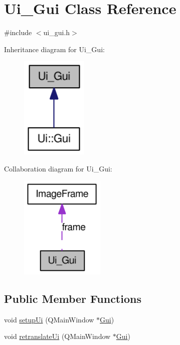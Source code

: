 \hypertarget{classUi__Gui}{
\section{Ui\_\-Gui Class Reference}
\label{classUi__Gui}
}


{\ttfamily \#include $<$ui\_\-gui.h$>$}



Inheritance diagram for Ui\_\-Gui:\nopagebreak
\begin{figure}[H]
\begin{center}
\leavevmode
\includegraphics[width=90pt]{classUi__Gui__inherit__graph}
\end{center}
\end{figure}


Collaboration diagram for Ui\_\-Gui:\nopagebreak
\begin{figure}[H]
\begin{center}
\leavevmode
\includegraphics[width=114pt]{classUi__Gui__coll__graph}
\end{center}
\end{figure}
\subsection*{Public Member Functions}
\begin{DoxyCompactItemize}
\item 
void \hyperlink{classUi__Gui_ac7b48f664dfaf8cec328b4234401e522}{setupUi} (QMainWindow $\ast$\hyperlink{classGui}{Gui})
\item 
void \hyperlink{classUi__Gui_a19b2bac2de017782b9a5cae039980387}{retranslateUi} (QMainWindow $\ast$\hyperlink{classGui}{Gui})
\end{DoxyCompactItemize}
